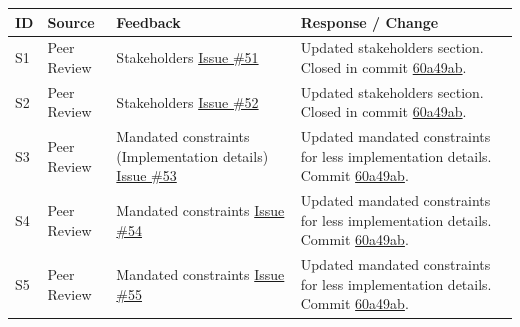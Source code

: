 \documentclass{article}
\begin{document}
\begin{longtable}{p{} p{} p{} p{}}
\toprule
\textbf{ID} & \textbf{Source} & \textbf{Feedback} & \textbf{Response / Change} \\
\midrule
\endhead
\bottomrule
\endfoot

S1 & Peer Review & Stakeholders \newline \href{https://github.com/The-Crazy-Four-Games/Crazy_1-0s_Game/issues/51}{Issue \#51} & Updated stakeholders section. \newline Closed in commit \href{https://github.com/The-Crazy-Four-Games/Crazy_1-0s_Game/commit/60a49abfd2c1113a1b3d0ebb3774e9e13c341231}{60a49ab}. \\
\midrule

S2 & Peer Review & Stakeholders \newline \href{https://github.com/The-Crazy-Four-Games/Crazy_1-0s_Game/issues/52}{Issue \#52} & Updated stakeholders section. \newline Closed in commit \href{https://github.com/The-Crazy-Four-Games/Crazy_1-0s_Game/commit/60a49abfd2c1113a1b3d0ebb3774e9e13c341231}{60a49ab}. \\
\midrule

S3 & Peer Review & Mandated constraints (Implementation details) \newline \href{https://github.com/The-Crazy-Four-Games/Crazy_1-0s_Game/issues/53}{Issue \#53} & Updated mandated constraints for less implementation details. \newline Commit \href{https://github.com/The-Crazy-Four-Games/Crazy_1-0s_Game/commit/60a49abfd2c1113a1b3d0ebb3774e9e13c341231}{60a49ab}. \\
\midrule

S4 & Peer Review & Mandated constraints \newline \href{https://github.com/The-Crazy-Four-Games/Crazy_1-0s_Game/issues/54}{Issue \#54} & Updated mandated constraints for less implementation details. \newline Commit \href{https://github.com/The-Crazy-Four-Games/Crazy_1-0s_Game/commit/60a49abfd2c1113a1b3d0ebb3774e9e13c341231}{60a49ab}. \\
\midrule

S5 & Peer Review & Mandated constraints \newline \href{https://github.com/The-Crazy-Four-Games/Crazy_1-0s_Game/issues/55}{Issue \#55} & Updated mandated constraints for less implementation details. \newline Commit \href{https://github.com/The-Crazy-Four-Games/Crazy_1-0s_Game/commit/60a49abfd2c1113a1b3d0ebb3774e9e13c341231}{60a49ab}. \\
\midrule


\end{longtable}
\end{document}

